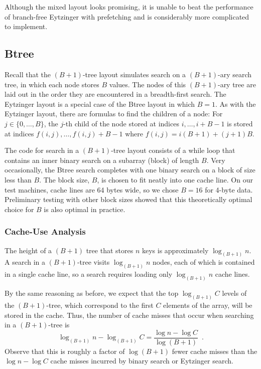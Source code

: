 \documentclass{patmorin}
\begin{document}
\begin{lesson}
  Although the mixed layout looks promising, it is unable to beat
  the performance of branch-free Eytzinger with prefetching and is
  considerably more complicated to implement.
\end{lesson}

\subsection{Btree}

Recall that the $(B+1)$-tree layout simulates search on a $(B+1)$-ary
search tree, in which each node stores $B$ values.  The nodes of this
$(B+1)$-ary tree are laid out in the order they are encountered in
a breadth-first search.  The Eytzinger layout is a special
case of the Btree layout in which $B=1$. As with the Eytzinger layout, there
are formulas to find the children of a node: For $j\in\{0,\ldots,B\}$, the
$j$-th child of the node stored at indices $i,\ldots,i+B-1$ is stored
at indices $f(i,j),\ldots,f(i,j)+B-1$ where $f(i,j)=i(B+1)+(j+1)B$.

The code for search in a $(B+1)$-tree layout consists of a while loop
that contains an inner binary search on a subarray (block) of length
$B$. Very occasionally, the Btree search completes with one binary search
on a block of size less than $B$. The block size, $B$, is chosen to fit
neatly into one cache line. On our test machines, cache lines are 64
bytes wide, so we chose $B=16$ for 4-byte data. Preliminary testing with
other block sizes showed that this theoretically optimal choice for $B$
is also optimal in practice.

\subsubsection{Cache-Use Analysis}

The height of a $(B+1)$ tree that stores $n$ keys is approximately
$\log_{(B+1)} n$.  A search in a $(B+1)$-tree visits $\log_{(B+1)} n$
nodes, each of which is contained in a single cache line, so a search
requires loading only $\log_{(B+1)} n$ cache lines.

By the same reasoning as before, we expect that the top $\log_{(B+1)} C$
levels of the $(B+1)$-tree, which correspond to the first $C$ elements
of the array, will be stored in the cache.  Thus, the number of cache
misses that occur when searching in a $(B+1)$-tree is
\[
    \log_{(B+1)}n - \log_{(B+1)} C 
         = \frac{\log n - \log C}{\log (B+1)} \enspace .
\]
Observe that this is roughly a factor of $\log(B+1)$ fewer cache misses
than the $\log n-\log C$ cache misses incurred by binary search or
Eytzinger search.
\end{document}
